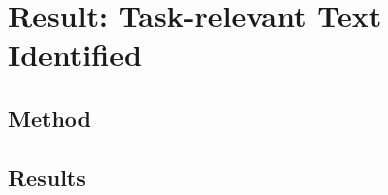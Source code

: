 
\section{Result: Task-relevant Text Identified}
\label{cp6:comparison}




\subsection{Method}



\subsection{Results}

















